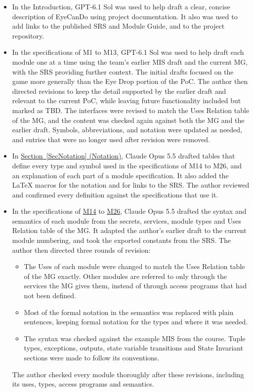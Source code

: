 \documentclass[10pt, titlepage]{article}
\newcommand{\misref}[2]{\hyperref[mis:#1]{M#2}}
\begin{document}
\begin{itemize}
    \item In the Introduction, GPT-6.1 Sol was used to help draft a clear, concise description
    of EyeCanDo using project documentation. It also was used to
    add links to the published SRS and Module Guide, and to the project
    repository.

    \item In the specifications of M1 to M13, GPT-6.1 Sol was used to help draft each module
    one at a time using the team's earlier MIS draft and the current MG,
    with the SRS providing further context. The initial drafts
    focused on the game more generally than the Eye Drop portion of the PoC.
    The author then directed revisions to keep the detail supported by the
    earlier draft and relevant to the current PoC, while leaving future
    functionality included but marked as TBD. The interfaces were revised to
    match the Uses Relation table of the MG, and the content was checked again
    against both the MG and the earlier draft. Symbols, abbreviations, and
    notation were updated as needed, and entries that were no longer used
    after revision were removed.

    \item In \hyperref[SecNotation]{Section~\ref*{SecNotation} (Notation)},
    Claude Opus 5.5 drafted tables that define every type and symbol used in
    the specifications of M14 to M26, and an explanation of each part of a
    module specification. It also added the \LaTeX{} macros for the notation
    and for links to the SRS. The author reviewed and confirmed every
    definition against the specifications that use it.

    \item In the specifications of
    \hyperref[mis:Reward]{\misref{Reward}{14}} to
    \hyperref[mis:Widgets]{\misref{Widgets}{26}}, Claude Opus 5.5 drafted the
    syntax and semantics of each module from the secrets, services, module
    types and Uses Relation table of the MG. It adapted the author's earlier
    draft to the current module numbering, and took the exported constants
    from the SRS. The author then directed three rounds of revision:
    \begin{itemize}
        \item The Uses of each module were changed to match the Uses Relation
        table of the MG exactly. Other modules are referred to only through
        the services the MG gives them, instead of through access programs
        that had not been defined.
        \item Most of the formal notation in the semantics was replaced with
        plain sentences, keeping formal notation for the types and where it
        was needed.
        \item The syntax was checked against the example MIS from the course.
        Tuple types, exceptions, outputs, state variable transitions and
        State Invariant sections were made to follow its conventions.
    \end{itemize}
    The author checked every module thoroughly after these revisions,
    including its uses, types, access programs and semantics.


\end{itemize}
\end{document}
